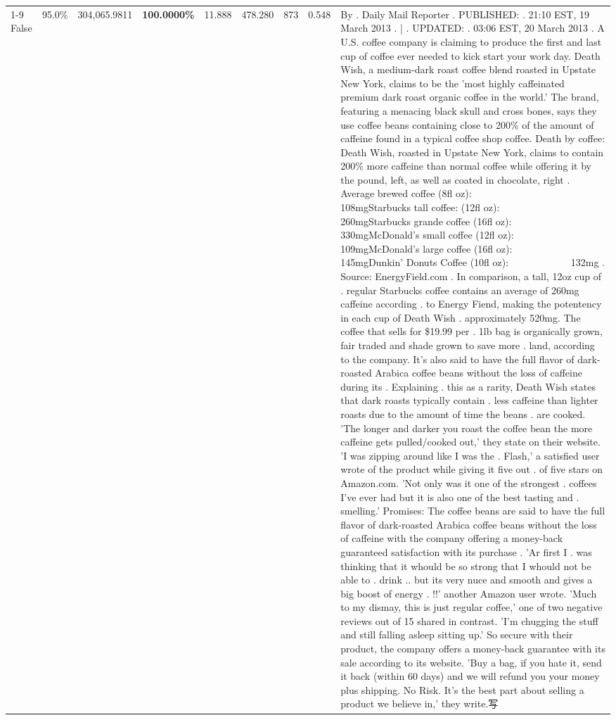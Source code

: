 \begin{table}[H]
{\begin{tabular}{lllrlllll}
\cline{1-9}
False & 95.0\% & 304,065.9811 & \bfseries \color{red} 100.0000\% & 11.888 & 478.280 & 873 & 0.548 & By . Daily Mail Reporter . PUBLISHED: . 21:10 EST, 19 March 2013 . | . UPDATED: . 03:06 EST, 20 March 2013 . A U.S. coffee company is claiming to produce the first and last cup of coffee ever needed to kick start your work day. Death Wish, a medium-dark roast coffee blend roasted in Upstate New York, claims to be the 'most highly caffeinated premium dark roast organic coffee in the world.' The brand, featuring a menacing black skull and cross bones, says they use coffee beans containing close to 200\% of the amount of caffeine found in a typical coffee shop coffee. Death by coffee: Death Wish, roasted in Upstate New York, claims to contain 200\% more caffeine than normal coffee while offering it by the pound, left, as well as coated in chocolate, right . Average brewed coffee (8fl oz):              108mgStarbucks tall coffee: (12fl oz):                260mgStarbucks grande coffee (16fl oz):         330mgMcDonald's small coffee (12fl oz):           109mgMcDonald's large coffee (16fl oz):           145mgDunkin' Donuts Coffee (10fl oz):             132mg . Source: EnergyField.com . In comparison, a tall, 12oz cup of . regular Starbucks coffee contains an average of 260mg caffeine according . to Energy Fiend, making the potentency in each cup of Death Wish . approximately 520mg. The coffee that sells for \$19.99 per . 1lb bag is organically grown, fair traded and shade grown to save more . land, according to the company. It's also said to have the full flavor of dark-roasted Arabica coffee beans without the loss of caffeine during its . Explaining . this as a rarity, Death Wish states that dark roasts typically contain . less caffeine than lighter roasts due to the amount of time the beans . are cooked. 'The longer and darker you roast the coffee bean the more caffeine gets pulled/cooked out,' they state on their website. 'I was zipping around like I was the . Flash,' a satisfied user wrote of the product while giving it five out . of five stars on Amazon.com. 'Not only was it one of the strongest . coffees I've ever had but it is also one of the best tasting and . smelling.’ Promises: The coffee beans are said to have the full flavor of dark-roasted Arabica coffee beans without the loss of caffeine with the company offering a money-back guaranteed satisfaction with its purchase . 'Ar first I . was thinking that it whould be so strong that I whould not be able to . drink .. but its very nuce and smooth and gives a big boost of energy . !!' another Amazon user wrote. 'Much to my dismay, this is just regular coffee,' one of two negative reviews out of 15 shared in contrast. 'I'm chugging the stuff and still falling asleep sitting up.' So secure with their product, the company offers a money-back guarantee with its sale according to its website. 'Buy a bag, if you hate it, send it back (within 60 days) and we will refund you your money plus shipping. No Risk. It’s the best part about selling a product we believe in,' they write.写 \\

\end{tabular}}
\end{table}
